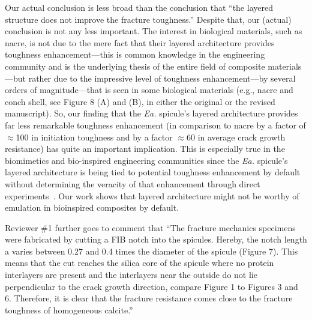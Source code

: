 \documentclass[11pt,letterpaper]{report}
\makeatletter
\newcommand{\EA}{\textit{Ea.\@}\xspace}
\makeatother
\begin{document}
Our actual conclusion is less broad than the conclusion that ``the layered structure does not improve the fracture toughness.'' Despite that, our (actual) conclusion is not any less important. The interest in biological materials, such as nacre, is not due to the mere fact that their layered architecture provides toughness enhancement---this is common knowledge in the engineering community and is the underlying thesis of the entire field of composite materials---but rather due to the impressive level of toughness enhancement---by several orders of magnitude---that is seen in some biological materials (e.g., nacre and conch shell, see Figure 8 (A) and (B), in either the original or the revised manuscript). So, our finding that the \EA spicule's layered architecture provides far less remarkable toughness enhancement (in comparison to nacre by a factor of $\approx$100 in initiation toughness and by a factor $\approx$60 in average crack growth resistance) has quite an important implication. This is especially true in the biomimetics and bio-inspired engineering communities since the \EA spicule's layered architecture is being tied to potential toughness enhancement by default without determining the veracity of that enhancement through direct experiments~\cite{mayer2011new, mayer2005rigid, kolednik2011bioinspired, walter2007mechanisms}. Our work shows that  layered architecture  might not be worthy of emulation in bioinspired composites by default.   

Reviewer \#1 further goes to comment that ``The fracture mechanics specimens were fabricated by cutting a FIB notch into the spicules. Hereby, the notch length a varies between 0.27 and 0.4 times the diameter of the spicule (Figure 7). This means that the cut reaches the silica core of the spicule where no protein interlayers are present and the interlayers near the outside do not lie perpendicular to the crack growth direction, compare Figure 1 to Figures 3 and 6. Therefore, it is clear that the fracture resistance comes close to the fracture toughness of homogeneous calcite.''
\end{document}
